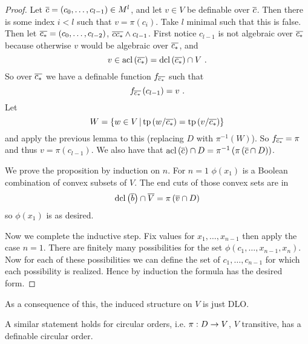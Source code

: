 \documentclass{amsart}
\begin{document}
\begin{proof}
Let $\overline{c} = \left(c_0 , \ldots , c_{l-1}\right) \in M^l$, and let $v\in V$ be definable
over $\overline{c}$. Then there is some index $i < l$ such that $v = \pi\left(c_i\right)$.
Take $l$ minimal such that this is false. Then let $\overline{c_*} = \left(c_0 , \ldots ,
c_{l-2}\right)$, $\overline{c} \overline{c_*}\land c_{l-1}$. First notice $c_{l-1}$ is not
algebraic over $\overline{c_*}$ 
because otherwise $v$ would be algebraic over $\overline{c_*}$, and
\begin{equation}
v\in \operatorname{acl}\left(\overline{c_*}\right) = \operatorname{dcl}\left(\overline{c_*}\right)\cap V \ .
\end{equation}
So over $\overline{c_*}$ we have a definable function $f_{\overline{c_*}}$
such that
\begin{equation}
f_{\oline{c_*}}\left(c_{l-1}\right) = v \ .
\end{equation}
Let 
\begin{equation}
W = \left\{w\in V \, \middle\vert \, \operatorname{tp}\left(w / \overline{c_*}\right) = \operatorname{tp}\left(v / \overline{c_*}\right)\right\}
\end{equation}
and apply the previous lemma to this (replacing $D$ with $\pi^{-1}\left(W\right)$). So
$f_{\overline{c_*}} = \pi$ and thus $v = \pi\left(c_{l-1}\right)$.
We also have that $\operatorname{acl}\left(\overline{c}\right)\cap D = \pi^{-1}\left(\pi\left(\overline{c}\cap
D\right)\right)$.

We prove the proposition by induction on $n$.
For $n = 1$
$\phi\left(x_1\right)$ is a Boolean combination of convex
subsets of $V$. The end cuts of those convex sets are in 
\begin{equation}
\operatorname{dcl}\left(\overline{b}\right)\cap \overline{V} = \pi\left(\overline{v}\cap D\right)
\end{equation}
so $\phi\left(x_1\right)$ is as desired.

Now we complete the inductive step. Fix values for $x_1 , \ldots , x_{n-1}$ then apply the
case $n = 1$. There are finitely many possibilities for the set $\phi\left(c_1 , \ldots ,
x_{n-1} , x_n\right)$. Now for each of these possibilities
we can define the set of $c_1 , \ldots , c_{n-1}$ for which each possibility is realized.
Hence by induction the formula has the desired form.
\end{proof}

As a consequence of this, the induced structure on $V$ is just DLO. 

\begin{prop}
A similar statement holds for circular orders, i.e. $\pi: D\rightarrow V$, $V$ transitive, has a
definable circular order.
\label{prop:circular}
\end{prop}
\end{document}
